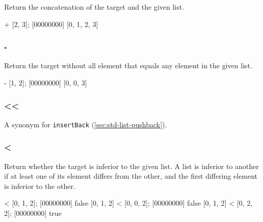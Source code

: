 Return the concatenation of the target and the given list.

\begin{urbiscript}[firstnumber=last]
[0, 1] + [2, 3];
[00000000] [0, 1, 2, 3]
\end{urbiscript}

\subsubsection{-}

Return the target without all element that equals any element in the
given list.

\begin{urbiscript}[firstnumber=last]
[0, 1, 0, 2, 3] - [1, 2];
[00000000] [0, 0, 3]
\end{urbiscript}

\subsubsection{\textless\textless}

A synonym for \lstinline|insertBack| (\autoref{sec:std-list-pushback}).

\subsubsection{\textless}

Return whether the target is inferior to the given list. A list is
inferior to another if at least one of its element differs from the
other, and the first differing element is inferior to the other.

\begin{urbiscript}[firstnumber=last]
[0, 1, 2] < [0, 1, 2];
[00000000] false
[0, 1, 2] < [0, 0, 2];
[00000000] false
[0, 1, 2] < [0, 2, 2];
[00000000] true
\end{urbiscript}



